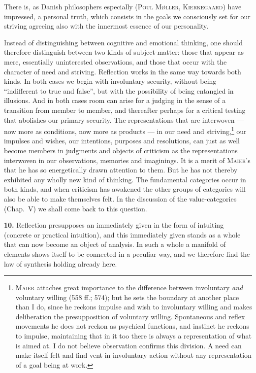 \documentclass[12pt]{book}
\newcommand{\hnum}[1]{\textbf{#1.}\enspace}
\newcommand{\opage}[1]{\marginnote{\footnotesize\textit{[#1]}}}
\begin{document}
There is, as Danish philosophers especially (\textsc{Poul Møller},
\textsc{Kierkegaard}) have impressed, a personal truth, which consists in the
goals we consciously set for our striving agreeing also with the innermost
essence of our personality.

Instead of distinguishing between cognitive and emotional thinking, one should
therefore distinguish between two kinds of subject-matter: those that appear as
mere, essentially uninterested observations, and those that occur with the
character of need and striving. Reflection works in the same way towards both
kinds. In both cases we begin with involuntary security, without being
``indifferent to true and false'', but with the possibility of being entangled in
illusions. And in both cases room can arise for a judging in the sense of a
transition from member to member, and thereafter perhaps for a critical testing
that abolishes our primary security. The representations that are interwoven ---
now more as conditions, now more as products --- in our need and
striving,\footnote{\textsc{Maier} attaches great importance to the difference
between involuntary \textit{and} voluntary willing (558 ff.; 574); but he sets
the boundary at another place than I do, since he reckons impulse and wish to
involuntary willing and makes deliberation the presupposition of voluntary
willing. Spontaneous and reflex movements he does not reckon as psychical
functions, and instinct he reckons to impulse, maintaining that in it too there
is always a representation of what is aimed at. I do not believe observation
confirms this division. A need can make itself felt and find vent in involuntary
action without any representation of a goal being at work.} our impulses and
wishes, our intentions, purposes \opage{28}and resolutions, can just as well become members
in judgments and objects of criticism as the representations interwoven in our
observations, memories and imaginings. It is a merit of \textsc{Maier}'s that he
has so energetically drawn attention to them. But he has not thereby exhibited
any wholly new kind of thinking. The fundamental categories occur in both kinds,
and when criticism has awakened the other groups of categories will also be able
to make themselves felt. In the discussion of the value-categories (Chap.\ V) we
shall come back to this question.

\hnum{10} Reflection presupposes an immediately given in the form of intuiting
(concrete or practical intuition), and this immediately given stands as a whole
that can now become an object of analysis. In such a whole a manifold of
elements shows itself to be connected in a peculiar way, and we therefore find
the law of synthesis holding already here.
\end{document}

